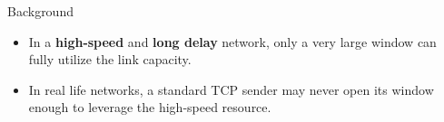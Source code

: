 \begin{frame}{Background}
	\begin{itemize}
	    \item In a \textbf{high-speed} and
		  \textbf{long delay} network, only a
		  very large window can fully utilize the link capacity.
	    \item In real life networks, a
		  standard TCP sender may never open its window enough
		  to leverage the high-speed resource.
	\end{itemize}
\end{frame}
